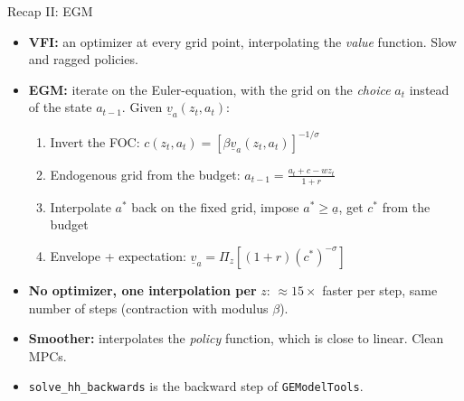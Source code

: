 \documentclass[
  10pt,
  ignorenonframetext,
  aspectratio=43,
  english,
]{beamer}
\providecommand{\tightlist}{%
  \setlength{\itemsep}{0pt}\setlength{\parskip}{0pt}}
\begin{document}
\begin{frame}[fragile]{Recap II: EGM}
\protect{}\label{recap-ii-egm}
\begin{itemize}
\tightlist
\item
  \textbf{VFI:} an optimizer at every grid point, interpolating the \emph{value} function. Slow and ragged policies.
\item
  \textbf{EGM:} iterate on the Euler-equation, with the grid on the \emph{choice} \(a_{t}\) instead of the state \(a_{t-1}\). Given \(\underline{v}_{a}(z_{t},a_{t})\):

  \begin{enumerate}
  \tightlist
  \item
    Invert the FOC: \(c(z_{t},a_{t})=\left[\beta\underline{v}_{a}(z_{t},a_{t})\right]^{-1/\sigma}\)
  \item
    Endogenous grid from the budget: \(a_{t-1}=\frac{a_{t}+c-wz_{t}}{1+r}\)
  \item
    Interpolate \(a^{\ast}\) back on the fixed grid, impose \(a^{\ast}\geq\underline{a}\), get \(c^{\ast}\) from the budget
  \item
    Envelope + expectation: \(\underline{v}_{a}=\Pi_{z}\left[(1+r)(c^{\ast})^{-\sigma}\right]\)
  \end{enumerate}
\item
  \textbf{No optimizer, one interpolation per} \(z\): \(\approx15\times\) faster per step, same number of steps (contraction with modulus \(\beta\)).
\item
  \textbf{Smoother:} interpolates the \emph{policy} function, which is close to linear. Clean MPCs.
\item
  \texttt{solve\_hh\_backwards} is the backward step of \texttt{GEModelTools}.
\end{itemize}
\end{frame}
\end{document}
